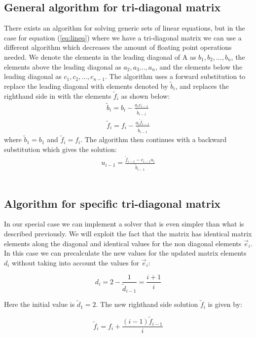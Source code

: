 \documentclass[norsk,a4paper,12pt]{article}
\begin{document}
\subsection{General algorithm for tri-diagonal matrix}

There exists an algorithm for solving generic sets of linear equations, but in the case for equation (\ref{eq:lineq})  where we have a tri-diagonal matrix we can use a different algorithm which decreases the amount of floating point operations needed. We denote the elements in the leading diagonal of A as $b_1, b_2, ..., b_n$, the elements above the leading diagonal as $a_2, a_3 ..., a_n$, and the elements below the leading diagonal as $c_1, c_2, ..., c_{n-1}$. The algorithm uses a forward substitution to replace the leading diagonal with elements denoted by $\tilde{b}_i$, and replaces the righthand side in with the elements $\tilde{f}_i$ as shown below:
\begin{align*}
\tilde{b}_i=b_i-\frac{a_ic_{i-1}}{\tilde{b}_{i-1}} \\
\tilde{f}_i=f_i-\frac{a_i\tilde{f}_{i-1}}{\tilde{b}_{i-1}}
\end{align*}
where $\tilde{b}_1=b_1$ and $\tilde{f}_i=f_i$. The algorithm then continues with a backward substitution which gives the solution:
\begin{align}
u_{i-1}=\frac{\tilde{f}_{i-1}-c_{i-1}u_i}{\tilde{b}_{i-1}}
\end{align}
\\
\subsection{Algorithm for specific tri-diagonal matrix}

In our special case we can implement a solver that is even simpler than what is described previously.  We will exploit the fact that the matrix has identical matrix elements along the diagonal and identical values for the non diagonal elements $\vec{e}_i$. In this case we can precalculate the new values for the updated matrix elements $d_i$ without taking into account the values for $\vec{e}_i$:

\begin{equation}
d_i = 2-\frac{1}{\tilde{d}_{i-1}}=\frac{i+1}{i}
 \label{eq:d_i}
 \end{equation}

Here the initial value is $\tilde{d}_1=2$. The new righthand side solution $\tilde{f}_i$ is given by:

\begin{equation}
\tilde{f}_i = f_i + \frac{(i-1)\tilde{f}_{i-1}}{i}
 \label{eq:f_i}
 \end{equation}
\end{document}
